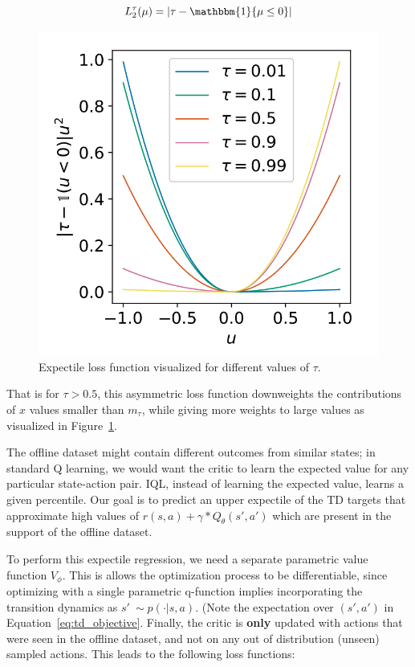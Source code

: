 \documentclass[12pt]{article}
\begin{document}
\begin{enumerate}
\begin{equation}
 L_2^\tau(\mu)= |\tau - \mathbbm{1} \{\mu \leq 0\}|    
\end{equation}
\begin{figure}[htbp]
    \centering
    \includegraphics[scale=0.32]{figures/expectile_example.png}
    \caption{Expectile loss function visualized for different values of $\tau$.}
    \label{fig:expectile_example}
\end{figure}

That is for $\tau > 0.5$, this asymmetric loss function downweights the contributions of $x$ values smaller than $m_\tau$, while giving more weights to large values as visualized in Figure~\ref{fig:expectile_example}.



The offline dataset might contain different outcomes from similar states; in standard Q learning, we would want the critic to learn the expected value for any particular state-action pair. IQL, instead of learning the expected value, learns a given percentile. Our goal is to predict an upper expectile of the TD targets that approximate high values of $r(s, a) + \gamma * Q_\theta(s', a')$ which are present in the support of the offline dataset.

 

To perform this expectile regression, we need a separate parametric value function $V_{\phi}$. This is allows the optimization process to be differentiable, since optimizing with a single parametric q-function implies incorporating the transition dynamics as $s' ~\sim p( \cdot |s, a)$. (Note the expectation over $(s', a')$ in Equation~\ref{eq:td_objective}. Finally, the critic is \textbf{only} updated with actions that were seen in the offline dataset, and not on any out of distribution (unseen) sampled actions. This leads to the following loss functions:


\end{enumerate}
\end{document}
